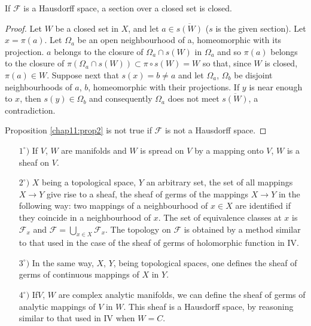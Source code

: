 \begin{proposition}\label{chap11:prop2}
If $\mathscr{F}$ is a Hausdorff space, a section over a closed set is
closed. 
\end{proposition}

\begin{proof}
Let $W$ be a closed set in $X$, and let $a \in \overline{s(W)}$ ($s$ is
the given section). Let $x = \pi (a)$. Let $\Omega_a$ be an open
neighbourhood of a, homeomorphic with its projection. $a$ belongs to
the closure of $\Omega_a \cap s (W)$  in $\Omega_a$ and so $\pi (a)$
belongs to the closure of $\pi (\Omega_a \cap s (W)) \subset \pi \circ
s (W) = W$ so that, since $W$ is closed, $\pi (a) \in W$. Suppose next
that $s(x) = b \neq a$ and let $\Omega_a$, $\Omega_b$ be disjoint
neighbourhoods of $a$, $b$, homeomorphic with their projections. If
$y$ is near enough to $x$, then $s(y) \in \Omega_b$ and consequently
$\Omega_a$ does not meet $\overline{s(W)}$, a contradiction.

Proposition \ref{chap11:prop2} is not true if $\mathscr{F}$ is not a
Hausdorff space.  
\end{proof}

\medskip
{}
\begin{itemize}
\item[$1^\circ)$] If $V$, $W$ are manifolds and $W$ is spread on $V$
  by a mapping onto $V$, $W$ is a sheaf on $V$.

\item[$2^\circ)$] $X$ being a topological space, $Y$ an arbitrary set,
  the set of all mappings $X \to Y$ give rise to a sheaf, the sheaf of
  germs of the mappings $X \to Y$ in the following way: two mappings
  of a neighbourhood of $x \in X$ are identified if they coincide in a
  neighbourhood of $x$. The set of equivalence classes at $x$ is
  $\mathscr{F}_x$ and $\mathscr{F} = \bigcup\limits_{x \in X}
  \mathscr{F}_x$. The topology on $\mathscr{F}$ is obtained by a
  method similar to that used in the case of the sheaf of germs of
  holomorphic function in IV. 

\item[$3^\circ)$] In the same way, $X$, $Y$, being topological spaces,
  one defines the sheaf of germs of continuous mappings of $X$ in
  $Y$. 

\item[$4^\circ)$] If\pageoriginale $V$, $W$ are complex analytic
  manifolds, we can define the sheaf of germs of analytic mappings of
  $V$ in $W$. This sheaf is a Hausdorff space, by reasoning similar to
  that used in IV when $W = C$. 
\end{itemize}


